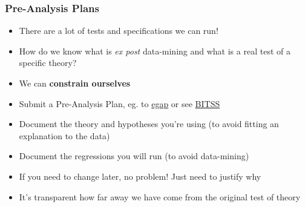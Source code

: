 \documentclass[xcolor=x11names,compress]{beamer}\usepackage[]{graphicx}\usepackage[]{color}
\renewcommand{\(}{\begin{columns}}
\renewcommand{\)}{\end{columns}}
\newcommand{\<}[1]{\begin{column}{#1}}
\renewcommand{\>}{\end{column}}
\begin{document}
\begin{frame}
\frametitle{Pre-Analysis Plans}
\begin{itemize}
\item There are a lot of tests and specifications we can run!
\pause
\item How do we know what is \textit{ex post} data-mining and what is a real test of a specific theory?
\pause
\item We can \textbf{constrain ourselves}
\pause
\item Submit a Pre-Analysis Plan, eg. to \href{https://egap.org/content/registration}{egap} or see \href{https://www.bitss.org/resource-tag/pre-analysis-plans/}{BITSS}
\pause
\item Document the theory and hypotheses you're using (to avoid fitting an explanation to the data)
\pause
\item Document the regressions you will run (to avoid data-mining)
\pause
\item If you need to change later, no problem! Just need to justify why
\pause
\item It's transparent how far away we have come from the original test of theory
\end{itemize}
\end{frame}
\end{document}
